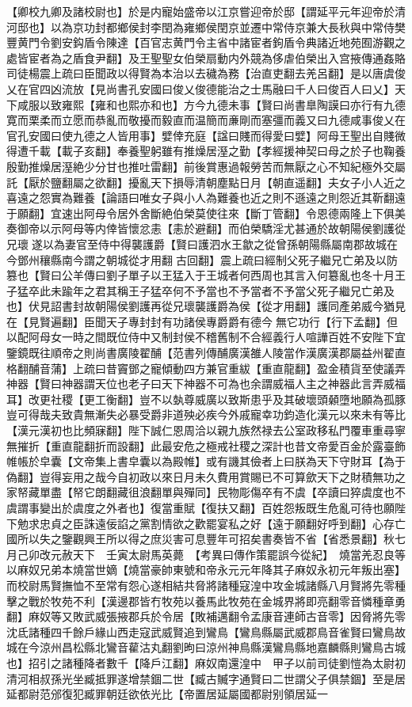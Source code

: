 【卿校九卿及諸校尉也】於是内寵始盛帝以江京嘗迎帝於邸【謂延平元年迎帝於清河邸也】以為京功封都鄉侯封李閏為雍鄉侯閏京並遷中常侍京兼大長秋與中常侍樊豐黄門令劉安鈎盾令陳達【百官志黄門令主省中諸宦者鉤盾令典諸近地苑囿游觀之處皆宦者為之盾食尹翻】及王聖聖女伯榮扇動内外競為侈虐伯榮出入宫掖傳通姦賂司徒楊震上疏曰臣聞政以得賢為本治以去穢為務【治直吏翻去羌呂翻】是以唐虞俊乂在官四凶流放【見尚書孔安國曰俊乂俊德能治之士馬融曰千人曰俊百人曰乂】天下咸服以致雍熙【雍和也熙亦和也】方今九德未事【賢曰尚書臯陶謨曰亦行有九德寛而栗柔而立愿而恭亂而敬擾而毅直而温簡而亷剛而塞彊而義又曰九德咸事俊乂在官孔安國曰使九德之人皆用事】嬖倖充庭【諡曰賤而得愛曰嬖】阿母王聖出自賤微得遭千載【載子亥翻】奉養聖躬雖有推燥居溼之勤【孝經援神契曰母之於子也鞠養殷勤推燥居溼絶少分甘也推吐雷翻】前後賞惠過報勞苦而無厭之心不知紀極外交屬託【厭於鹽翻屬之欲翻】擾亂天下損辱清朝塵點日月【朝直遥翻】夫女子小人近之喜遠之怨實為難養【論語曰唯女子與小人為難養也近之則不遜遠之則怨近其靳翻遠于願翻】宜速出阿母令居外舍斷絶伯榮莫使往來【斷丁管翻】令恩德兩隆上下俱美奏御帝以示阿母等内倖皆懷忿恚【恚於避翻】而伯榮驕淫尤甚通於故朝陽侯劉護從兄瓌遂以為妻官至侍中得襲護爵【賢曰護泗水王歙之從曾孫朝陽縣屬南郡故城在今鄧州穰縣南今謂之朝城從才用翻古回翻】震上疏曰經制父死子繼兄亡弟及以防篡也【賢曰公羊傳曰劉子單子以王猛入于王城者何西周也其言入何簒亂也冬十月王子猛卒此未踰年之君其稱王子猛卒何不予當也不予當者不予當父死子繼兄亡弟及也】伏見詔書封故朝陽侯劉護再從兄瓌襲護爵為侯【從才用翻】護同產弟威今猶見在【見賢遍翻】臣聞天子專封封有功諸侯專爵爵有德今無它功行【行下孟翻】但以配阿母女一時之間既位侍中又制封侯不稽舊制不合經義行人喧譁百姓不安陛下宜鑒鏡既往順帝之則尚書廣陵翟酺【范書列傳酺廣漢雒人陵當作漢廣漢郡屬益州翟直格翻酺音蒲】上疏曰昔竇鄧之寵傾動四方兼官重紱【重直龍翻】盈金積貨至使議弄神器【賢曰神器謂天位也老子曰天下神器不可為也余謂威福人主之神器此言弄威福耳】改更社稷【更工衡翻】豈不以埶尊威廣以致斯患乎及其破壞頭顙墮地願為孤豚豈可得哉夫致貴無漸失必暴受爵非道殃必疾今外戚寵幸功鈞造化漢元以來未有等比【漢元漢初也比頻寐翻】陛下誠仁恩周洽以親九族然禄去公室政移私門覆車重尋寧無摧折【重直龍翻折而設翻】此最安危之極戒社稷之深計也昔文帝愛百金於露臺飾帷帳於皁囊【文帝集上書皁囊以為殿帷】或有譏其儉者上曰朕為天下守財耳【為于偽翻】豈得妄用之哉今自初政以來日月未久費用賞賜已不可算歛天下之財積無功之家帑藏單盡【帑它朗翻藏徂浪翻單與殫同】民物彫傷卒有不虞【卒讀曰猝虞度也不虞謂事變出於虞度之外者也】復當重賦【復扶又翻】百姓怨叛既生危亂可待也願陛下勉求忠貞之臣誅遠佞諂之黨割情欲之歡罷宴私之好【遠于願翻好呼到翻】心存亡國所以失之鑒觀興王所以得之庶災害可息豐年可招矣書奏皆不省【省悉景翻】秋七月己卯改元赦天下　壬寅太尉馬英薨　【考異曰傳作策罷誤今從紀】　燒當羌忍良等以麻奴兄弟本燒當世嫡【燒當豪帥東號和帝永元元年降其子麻奴永初元年叛出塞】而校尉馬賢撫恤不至常有怨心遂相結共脅將諸種寇湟中攻金城諸縣八月賢將先零種擊之戰於牧苑不利【漢邊郡皆冇牧苑以養馬此牧苑在金城界將即亮翻零音憐種章勇翻】麻奴等又敗武威張掖郡兵於令居【敗補邁翻令孟康音連師古音零】因脅將先零沈氐諸種四千餘戶緣山西走寇武威賢追到鸞鳥【鸞鳥縣屬武威郡鳥音雀賢曰鸞鳥故城在今涼州昌松縣北鸞音雚沽丸翻劉昫曰涼州神鳥縣漢鸞鳥縣地嘉麟縣則鸞鳥古城也】招引之諸種降者數千【降戶江翻】麻奴南還湟中　甲子以前司徒劉愷為太尉初清河相叔孫光坐臧抵罪遂增禁錮二世【臧古贓字通賢曰二世謂父子俱禁錮】至是居延都尉范邠復犯臧罪朝廷欲依光比【帝置居延屬國都尉别領居延一